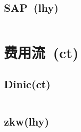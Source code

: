	\subsection*{SAP\ \small(lhy)}
		\inputminted{cpp}{GraphTheory/sap.cpp}
\section{费用流\ \small(ct)}
	\subsection*{Dinic(ct)}
		\inputminted{cpp}{GraphTheory/min_cost_max_flow.cpp}
	\subsection*{zkw(lhy)}
		\inputminted{cpp}{GraphTheory/zkw_min_cost_flow.cpp}
